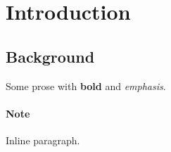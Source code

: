\section{Introduction}
\subsection{Background}
Some prose with \textbf{bold} and \emph{emphasis}.
\paragraph{Note} Inline paragraph.
